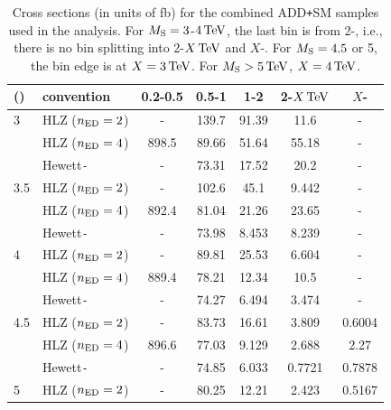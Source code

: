 \begin{table}[htbp!]
	\centering
	\caption{Cross sections (in units of fb) for the combined ADD\texttt{+}SM samples used in the analysis. For $M_{\rm S}=3$-$4\,\text{Te\hspace{-.08em}V}$, the last \Mgg bin is from 2-\Ms\TeVns, i.e., there is no bin splitting into 2-$X\,\text{Te\hspace{-.08em}V}$ and $X$-\Ms\TeVns. For $M_{\rm S}=4.5$ or 5\TeV, the bin edge is at $X = 3\,\text{Te\hspace{-.08em}V}$. For $M_{\rm S}>5\,\text{Te\hspace{-.08em}V}$, $X=4\,\text{Te\hspace{-.08em}V}$.}
	\label{tab:ADD_signal_samples}
  \vspace{\baselineskip}
	\begin{tabular}{ll|ccccc}
		\hline %
		\hline %
		\Ms ({\TeVns}) & \KK convention & 0.2-0.5\TeV & 0.5-1\TeV & 1-2\TeV  & 2-$X\,\text{Te\hspace{-.08em}V}$ & $X$-\Ms\TeVns \\
		\hline
		3          & HLZ ($n_{\rm ED}=2$) & -            & 139.7      & 91.39     & 11.6       & -            \\
		           & HLZ ($n_{\rm ED}=4$) & 898.5        & 89.66      & 51.64     & 55.18      & -            \\
		           & Hewett\texttt{-}        & -            & 73.31      & 17.52     & 20.2       & -            \\
		3.5        & HLZ ($n_{\rm ED}=2$) & -            & 102.6      & 45.1      & 9.442      & -            \\
		           & HLZ ($n_{\rm ED}=4$) & 892.4        & 81.04      & 21.26     & 23.65      & -            \\
		           & Hewett\texttt{-}        & -            & 73.98      & 8.453     & 8.239      & -            \\
		4          & HLZ ($n_{\rm ED}=2$) & -            & 89.81      & 25.53     & 6.604      & -            \\
		           & HLZ ($n_{\rm ED}=4$) & 889.4        & 78.21      & 12.34     & 10.5       & -            \\
		           & Hewett\texttt{-}        & -            & 74.27      & 6.494     & 3.474      & -            \\
		4.5        & HLZ ($n_{\rm ED}=2$) & -            & 83.73      & 16.61     & 3.809      & 0.6004       \\
		           & HLZ ($n_{\rm ED}=4$) & 896.6        & 77.03      & 9.129     & 2.688      & 2.27         \\
		           & Hewett\texttt{-}        & -            & 74.85      & 6.033     & 0.7721     & 0.7878       \\
		5          & HLZ ($n_{\rm ED}=2$) & -            & 80.25      & 12.21     & 2.423      & 0.5167       \\

\end{tabular}
\end{table}
